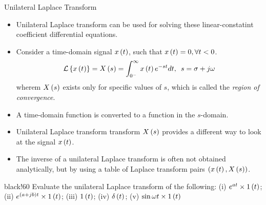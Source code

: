 \documentclass[aspectratio=169]{beamer}
\def\lp{\ensuremath\left(}
\def\rp{\ensuremath\right)}
\def\lc{\ensuremath\left\{}
\def\rc{\ensuremath\right\}}
\newcommand{\demoex}[2]{\onslide<#1->\begin{color}{black!60} #2 \end{color}}
\begin{document}
\begin{frame}{Unilateral Laplace Transform}
\begin{itemize}
    \item Unilateral Laplace transform can be used for solving these linear-constatint coefficient differential equations.

    \item Consider a time-domain signal $x\lp t\rp$, such that $x\lp t\rp = 0, \forall t < 0$.    
    \[ \mathcal{L}\lc x\lp t\rp\rc = X\lp s\rp = \int_{0^-}^{\infty} x\lp t\rp e^{-st}dt, \,\,\, s = \sigma + j\omega \]
    wherem $X\lp s\rp$ exists only for specific values of $s$, which is called the \textit{region of convergence}.

    \item A time-domain function is converted to a function in the $s$-domain. 

    \item Unilateral Laplace transform transform $X\lp s\rp$ provides a different way to look at the signal $x\lp t\rp$.

    \item The inverse of a unilateral Laplace transform is often not obtained analytically, but by using a table of Laplace transform pairs $\lp x\lp t\rp, X\lp s\rp\rp$.

\end{itemize}
\vspace{-0.1cm}
\demoex{2}{
Evaluate the unilateral Laplace transform of the following: (i) $e^{at} \times 1\lp t\rp$; (ii) $e^{\lp a + jb\rp t} \times 1\lp t\rp$; (iii) $1\lp t\rp$; (iv) $\delta \lp t\rp$; (v) $\sin \omega t \times 1\lp t\rp$
}
\end{frame}
\end{document}

